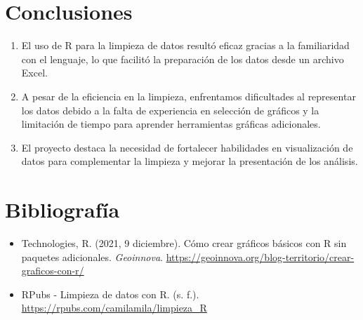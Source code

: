 \documentclass[12pt]{article}
\begin{document}
    \newpage
    \section{Conclusiones}
        \begin{enumerate}
            \item El uso de R para la limpieza de datos resultó eficaz gracias a la familiaridad con el lenguaje, lo que facilitó la preparación de los datos desde un archivo Excel.
            \item A pesar de la eficiencia en la limpieza, enfrentamos dificultades al representar los datos debido a la falta de experiencia en selección de gráficos y la limitación de tiempo para aprender herramientas gráficas adicionales.
            \item El proyecto destaca la necesidad de fortalecer habilidades en visualización de datos para complementar la limpieza y mejorar la presentación de los análisis.
        \end{enumerate}


    \section{Bibliografía}
        \begin{itemize}
            \item Technologies, R. (2021, 9 diciembre). Cómo crear gráficos básicos con R sin paquetes adicionales. \textit{Geoinnova}. \url{https://geoinnova.org/blog-territorio/crear-graficos-con-r/}
            \item RPubs - Limpieza de datos con R. (s. f.). \url{https://rpubs.com/camilamila/limpieza_R}
        \end{itemize}
    
\end{document}
